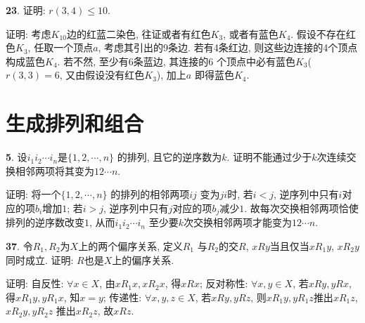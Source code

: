 \documentclass[12pt,a4paper]{article}
\begin{document}
\begin{CJK*}{GBK}{song}
\par \textbf{23}. 证明: $r(3,4)\le 10$.
\par 证明: 考虑$K_{10}$边的红蓝二染色, 往证或者有红色$K_3$, 或者有蓝色$K_4$. 假设不存在红色$K_3$, 任取一个顶点$a$, 考虑其引出的9条边. 若有4条红边, 则这些边连接的4个顶点构成蓝色$K_4$. 若不然, 至少有6条蓝边, 其连接的6 个顶点中必有蓝色$K_3$($r(3,3)=6$, 又由假设没有红色$K_3$), 加上$a$ 即得蓝色$K_4$.

\section{生成排列和组合}
\par \textbf{5}. 设$i_1 i_2\cdots i_n$是$\{1,2,\cdots,n\}$ 的排列, 且它的逆序数为$k$. 证明不能通过少于$k$次连续交换相邻两项将其变为$12\cdots n$.
\par 证明: 将一个$\{1,2,\cdots,n\}$ 的排列的相邻两项$ij$ 变为$ji$时, 若$i<j$, 逆序列中只有$i$对应的项$b_i$增加$1$; 若$i>j$, 逆序列中只有$j$对应的项$b_j$减少$1$. 故每次交换相邻两项恰使排列的逆序数改变$1$, 从而$i_1 i_2\cdots i_n$ 至少要$k$次交换相邻两项才能变为$12\cdots n$.

\par \textbf{37}. 令$R_1,R_2$为$X$上的两个偏序关系, 定义$R_1$ 与$R_2$的交$R$, $xRy$当且仅当$xR_1y$, $xR_2y$ 同时成立. 证明: $R$也是$X$上的偏序关系.
\par 证明: 自反性: $\forall x \in X$, 由$xR_1x, xR_2x$, 得$xRx$; 反对称性: $\forall x,y \in X$, 若$xRy, yRx$, 得$xR_1y, yR_1x$, 知$x=y$; 传递性: $\forall x,y,z \in X$, 若$xRy, yRz$, 则$xR_1y, yR_1z$推出$xR_1z$, $xR_2y, yR_2z$ 推出$xR_2z$, 故$xRz$.


\end{CJK*}
\end{document}
